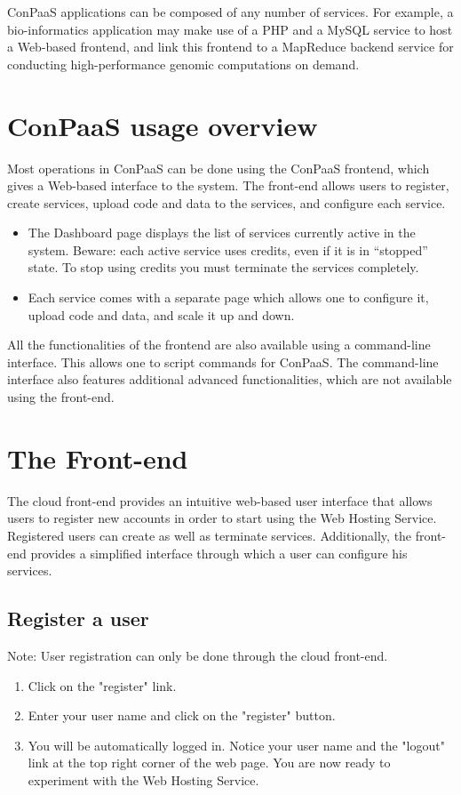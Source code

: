 \documentclass[10pt]{article}
\begin{document}
ConPaaS applications can be composed of any number of services. For
example, a bio-informatics application may make use of a PHP and a
MySQL service to host a Web-based frontend, and link this frontend to
a MapReduce backend service for conducting high-performance genomic
computations on demand.

\section{ConPaaS usage overview}

Most operations in ConPaaS can be done using the ConPaaS frontend,
which gives a Web-based interface to the system. The front-end allows
users to register, create services, upload code and data to the
services, and configure each service. 

\begin{itemize}
\item The Dashboard page displays the list of services currently
  active in the system. Beware: each active service uses credits, even
  if it is in ``stopped'' state. To stop using credits you must
  terminate the services completely.
\item Each service comes with a separate page which allows one to
  configure it, upload code and data, and scale it up and down.
\end{itemize}

All the functionalities of the frontend are also available using a
command-line interface. This allows one to script commands for
ConPaaS. The command-line interface also features additional advanced
functionalities, which are not available using the front-end.


\section{The Front-end}

The cloud front-end provides an intuitive web-based user interface that
allows users to register new accounts in order to start using the Web
Hosting Service. Registered users can create as well as terminate
services. Additionally, the front-end provides a simplified interface
through which a user can configure his services.

\subsection{Register a user}
Note: User registration can only be done through the cloud front-end.
\begin{enumerate}
\item Click on the "register" link.
\item Enter your user name and click on the "register" button.
\item You will be automatically logged in. Notice your user name and
  the "logout" link at the top right corner of the web page. You are
  now ready to experiment with the Web Hosting Service.
\end{enumerate}
\end{document}

